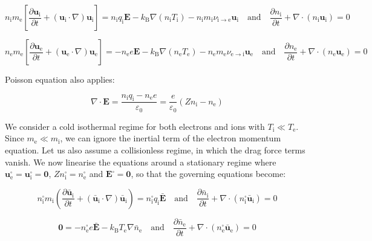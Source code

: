 \begin{equation}
    n_\mathrm{i}m_\text{e}\left[\frac{\partial\mathbf{u}_\mathrm{i}}{\partial t}+(\mathbf{u}_\mathrm{i}\cdot\nabla)\mathbf{u}_\mathrm{i}\right]=n_\mathrm{i}q_\mathrm{i}\mathbf{E}-k_\mathrm{B}\nabla(n_\mathrm{i}T_\mathrm{i})-n_\mathrm{i}m_\mathrm{i}\nu_{\mathrm{i}\to\text{e}}\mathbf{u}_\mathrm{i}\quad\text{and}\quad\frac{\partial n_\mathrm{i}}{\partial t}+\nabla\cdot(n_\mathrm{i}\mathbf{u}_\mathrm{i})=0
\end{equation}

\begin{equation}
    n_\text{e}m_\text{e}\left[\frac{\partial\mathbf{u}_\text{e}}{\partial t}+(\mathbf{u}_\text{e}\cdot\nabla)\mathbf{u}_\text{e}\right]=-n_\text{e}e\mathbf{E}-k_\mathrm{B}\nabla(n_\text{e}T_\text{e})-n_\text{e}m_\text{e}\nu_{\text{e}\to\mathrm{i}}\mathbf{u}_\text{e}\quad\text{and}\quad\frac{\partial n_\text{e}}{\partial t}+\nabla\cdot(n_\text{e}\mathbf{u}_\text{e})=0
\end{equation}

Poisson equation also applies:

\begin{equation}
    \nabla\cdot\mathbf{E}=\frac{n_\mathrm{i}q_\mathrm{i}-n_\text{e}e}{\varepsilon_0}=\frac{e}{\varepsilon_0}\left(Zn_\mathrm{i}-n_\text{e}\right)
\end{equation}

We consider a cold isothermal regime for both electrons and ions with $T_\mathrm{i}\ll T_\text{e}$. Since $m_\text{e}\ll m_\mathrm{i}$, we can ignore the inertial term of the electron momentum equation. Let us also assume a collisionless regime, in which the drag force terms vanish. We now linearise the equations around a stationary regime where $\mathbf{u}_\text{e}^\square=\mathbf{u}_\mathrm{i}^\square=\mathbf{0}$, $Zn_\mathrm{i}^\square=n_\text{e}^\square$ and $\mathbf{E}^\square=\mathbf{0}$, so that the governing equations become:

\begin{equation}
    n_\mathrm{i}^\square m_\mathrm{i}\left(\frac{\partial\bar{\mathbf{u}}_\mathrm{i}}{\partial t}+(\bar{\mathbf{u}}_\mathrm{i}\cdot\nabla)\bar{\mathbf{u}}_\mathrm{i}\right)=n_\mathrm{i}^\square q_\mathrm{i}\bar{\mathbf{E}}\quad\text{and}\quad\frac{\partial\bar{n}_\mathrm{i}}{\partial t}+\nabla\cdot(n_\mathrm{i}^\square\bar{\mathbf{u}}_\mathrm{i})=0
\end{equation}

\begin{equation}
    \mathbf{0}=-n_\text{e}^\square e\bar{\mathbf{E}}-k_\mathrm{B}T_\text{e}\nabla\bar{n}_\text{e}\quad\text{and}\quad\frac{\partial\bar{n}_\text{e}}{\partial t}+\nabla\cdot(n_\text{e}^\square\bar{\mathbf{u}}_\text{e})=0
\end{equation}

